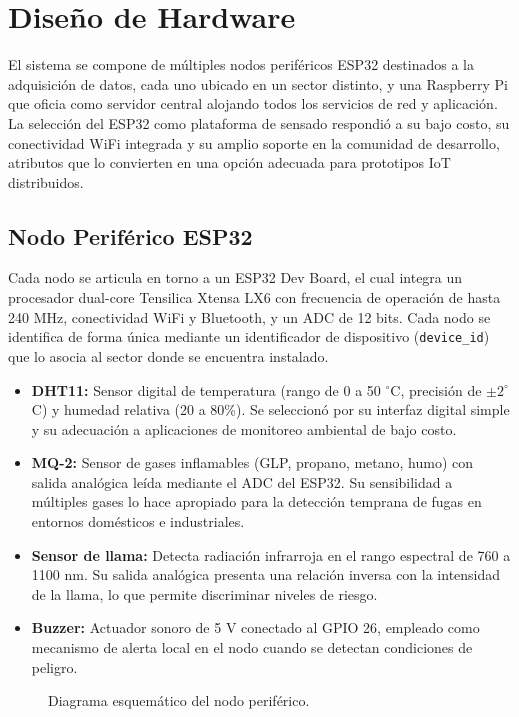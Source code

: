 \documentclass[11pt,a4paper]{article}
\begin{document}
\section{Dise\~no de Hardware}
El sistema se compone de m\'ultiples nodos perif\'ericos ESP32 destinados a la adquisici\'on de datos, cada uno ubicado en un sector distinto, y una Raspberry Pi que oficia como servidor central alojando todos los servicios de red y aplicaci\'on. La selecci\'on del ESP32 como plataforma de sensado respondi\'o a su bajo costo, su conectividad WiFi integrada y su amplio soporte en la comunidad de desarrollo, atributos que lo convierten en una opci\'on adecuada para prototipos IoT distribuidos.

\subsection{Nodo Perif\'erico ESP32}
Cada nodo se articula en torno a un ESP32 Dev Board, el cual integra un procesador dual-core Tensilica Xtensa LX6 con frecuencia de operaci\'on de hasta 240 MHz, conectividad WiFi y Bluetooth, y un ADC de 12 bits. Cada nodo se identifica de forma \'unica mediante un identificador de dispositivo (\texttt{device\_id}) que lo asocia al sector donde se encuentra instalado.

\begin{itemize}
    \item \textbf{DHT11:} Sensor digital de temperatura (rango de 0 a 50 $^{\circ}$C, precisi\'on de $\pm 2^{\circ}$C) y humedad relativa (20 a 80\%). Se seleccion\'o por su interfaz digital simple y su adecuaci\'on a aplicaciones de monitoreo ambiental de bajo costo.
    \item \textbf{MQ-2:} Sensor de gases inflamables (GLP, propano, metano, humo) con salida anal\'ogica le\'ida mediante el ADC del ESP32. Su sensibilidad a m\'ultiples gases lo hace apropiado para la detecci\'on temprana de fugas en entornos dom\'esticos e industriales.
    \item \textbf{Sensor de llama:} Detecta radiaci\'on infrarroja en el rango espectral de 760 a 1100 nm. Su salida anal\'ogica presenta una relaci\'on inversa con la intensidad de la llama, lo que permite discriminar niveles de riesgo.
    \item \textbf{Buzzer:} Actuador sonoro de 5 V conectado al GPIO 26, empleado como mecanismo de alerta local en el nodo cuando se detectan condiciones de peligro.
\end{itemize}

\begin{figure}[H]
    \centering
    \caption{Diagrama esquem\'atico del nodo perif\'erico.}
    \label{fig:esquematico}
\end{figure}
\end{document}
